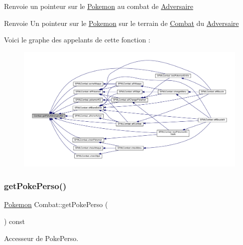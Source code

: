 Renvoie un pointeur sur le \hyperlink{class_pokemon}{Pokemon} au combat de \hyperlink{class_adversaire}{Adversaire} \begin{DoxyReturn}{Renvoie}
Un pointeur sur le \hyperlink{class_pokemon}{Pokemon} sur le terrain de \hyperlink{class_combat}{Combat} du \hyperlink{class_adversaire}{Adversaire} 
\end{DoxyReturn}
Voici le graphe des appelants de cette fonction \+:\nopagebreak
\begin{figure}[H]
\begin{center}
\leavevmode
\includegraphics[width=350pt]{class_combat_a4f02e335d825eb98b64d5410a590b9f8_icgraph}
\end{center}
\end{figure}
\mbox{\label{class_combat_a6f3c9e5df27cfb30359dcb0425a45f6d}} 
\subsubsection{\texorpdfstring{get\+Poke\+Perso()}{getPokePerso()}}
{\footnotesize\ttfamily \hyperlink{class_pokemon}{Pokemon} Combat\+::get\+Poke\+Perso (\begin{DoxyParamCaption}{ }\end{DoxyParamCaption}) const}



Accesseur de Poke\+Perso. 

